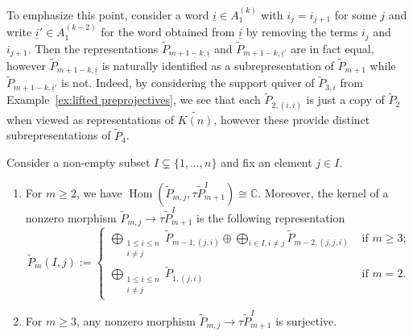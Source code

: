 \documentclass[smallextended,envcountsect,envcountsame]{svjour3}
\numberwithin{equation}{section}
\newcommand{\CC}{\mathbb{C}}
\newcommand{\ui}{{\underline i}}
\newcommand{\Hom}{\operatorname{Hom}}
\begin{document}
To emphasize this point, consider a word $\ui\in A_1^{(k)}$ with $i_j=i_{j+1}$ for some $j$ and write $\ui'\in A_1^{(k-2)}$ for the word obtained from $\ui$ by removing the terms $i_j$ and $i_{j+1}$.
Then the representations $\tilde P_{m+1-k,\ui}$ and $\tilde P_{m+1-k,\ui'}$ are in fact equal, however $\tilde P_{m+1-k,\ui}$ is naturally identified as a subrepresentation of $\tilde P_{m+1}$ while $\tilde P_{m+1-k,\ui'}$ is not.
Indeed, by considering the support quiver of $\tilde P_{3,i}$ from Example~\ref{ex:lifted preprojectives}, we see that each $\tilde P_{2,(i,i)}$ is just a copy of $\tilde P_2$ when viewed as representations of $\widetilde{K(n)}$, however these provide distinct subrepresentations of $\tilde P_4$.
\begin{lemma}
  \label{le:special subrepresentations}
  Consider a non-empty subset $I\subsetneq\{1,\ldots,n\}$ and fix an element $j\in I$. 
  \begin{enumerate}
    \item For $m\ge2$, we have $\Hom(\tilde P_{m,j},\tau\tilde P_{m+1}^I)\cong\CC$.
      Moreover, the kernel of a nonzero morphism $\tilde P_{m,j}\to\tau\tilde P_{m+1}^I$ is the following representation 
      \[\tilde P_m(I,j):=
        \begin{cases}
          \bigoplus_{\substack{1\leq i\leq n\\i\neq j}}\tilde P_{m-1,(j,i)}\oplus \bigoplus_{i\in I, i\ne j}\tilde P_{m-2,(j,j,i)} & \text{ if $m\geq 3$;}\\
          \bigoplus_{\substack{1\leq i\leq n\\i\neq j}}\tilde P_{1,(j,i)} & \text{ if $m=2$.}
        \end{cases}\]
    \item For $m\ge3$, any nonzero morphism $\tilde P_{m,j}\to\tau\tilde P_{m+1}^I$ is surjective.
  \end{enumerate}
\end{lemma}
\end{document}
